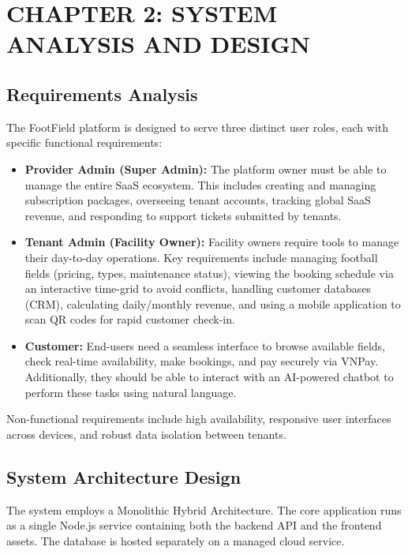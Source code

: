 \section*{CHAPTER 2: SYSTEM ANALYSIS AND DESIGN}
\setcounter{section}{2}
\setcounter{subsection}{0}
\setcounter{figure}{0}
\setcounter{table}{0}

\subsection{Requirements Analysis}
The FootField platform is designed to serve three distinct user roles, each with specific functional requirements:

\begin{itemize}
    \item \textbf{Provider Admin (Super Admin):} The platform owner must be able to manage the entire SaaS ecosystem. This includes creating and managing subscription packages, overseeing tenant accounts, tracking global SaaS revenue, and responding to support tickets submitted by tenants.
    \item \textbf{Tenant Admin (Facility Owner):} Facility owners require tools to manage their day-to-day operations. Key requirements include managing football fields (pricing, types, maintenance status), viewing the booking schedule via an interactive time-grid to avoid conflicts, handling customer databases (CRM), calculating daily/monthly revenue, and using a mobile application to scan QR codes for rapid customer check-in.
    \item \textbf{Customer:} End-users need a seamless interface to browse available fields, check real-time availability, make bookings, and pay securely via VNPay. Additionally, they should be able to interact with an AI-powered chatbot to perform these tasks using natural language.
\end{itemize}

Non-functional requirements include high availability, responsive user interfaces across devices, and robust data isolation between tenants.

\subsection{System Architecture Design}

The system employs a Monolithic Hybrid Architecture. The core application runs as a single Node.js service containing both the backend API and the frontend assets. The database is hosted separately on a managed cloud service.

